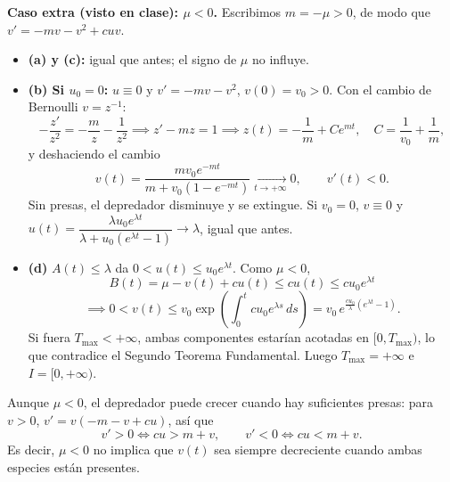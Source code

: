 {\begin{center}
    \end{center}

    \textbf{Caso extra (visto en clase): $\mu < 0$.} Escribimos $m = -\mu > 0$, de modo que $v' = -m v - v^2 + c u v$.
    \begin{itemize}
        \item \textbf{(a) y (c):} igual que antes; el signo de $\mu$ no influye.
        \item \textbf{(b) Si $u_0 = 0$:} $u \equiv 0$ y $v' = -m v - v^2$, $v(0) = v_0 > 0$. Con el cambio de Bernoulli $v = z^{-1}$:
        \[
            -\frac{z'}{z^2} = -\frac{m}{z} - \frac{1}{z^2} \implies z' - m z = 1 \implies z(t) = -\frac{1}{m} + C e^{mt}, \quad C = \frac{1}{v_0} + \frac{1}{m},
        \]
        y deshaciendo el cambio
        \[
            v(t) = \frac{m v_0 e^{-mt}}{m + v_0 \left( 1 - e^{-mt} \right)} \xrightarrow[t \to +\infty]{} 0, \qquad v'(t) < 0.
        \]
        Sin presas, el depredador disminuye y se extingue. Si $v_0 = 0$, $v \equiv 0$ y $u(t) = \dfrac{\lambda u_0 e^{\lambda t}}{\lambda + u_0 \left( e^{\lambda t} - 1 \right)} \to \lambda$, igual que antes.
        \item \textbf{(d)} $A(t) \le \lambda$ da $0 < u(t) \le u_0 e^{\lambda t}$. Como $\mu < 0$,
        \[
            B(t) = \mu - v(t) + c u(t) \le c u(t) \le c u_0 e^{\lambda t}
        \]
        \[
            \implies 0 < v(t) \le v_0 \exp\left( \int_0^t c u_0 e^{\lambda s} \, ds \right) = v_0 \, e^{\frac{c u_0}{\lambda}\left( e^{\lambda t} - 1 \right)}.
        \]
        Si fuera $T_{\max} < +\infty$, ambas componentes estarían acotadas en $[0, T_{\max})$, lo que contradice el Segundo Teorema Fundamental. Luego $T_{\max} = +\infty$ e $I = [0, +\infty)$.
    \end{itemize}
    Aunque $\mu < 0$, el depredador puede crecer cuando hay suficientes presas: para $v > 0$, $v' = v(-m - v + cu)$, así que
    \[
        v' > 0 \iff c u > m + v, \qquad v' < 0 \iff c u < m + v.
    \]
    Es decir, $\mu < 0$ no implica que $v(t)$ sea siempre decreciente cuando ambas especies están presentes.
}

